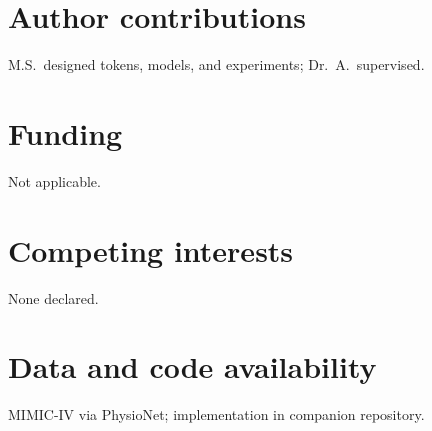 \section*{Author contributions}
M.S.\ designed tokens, models, and experiments; Dr.\ A.\ supervised.

\section*{Funding}
Not applicable.

\section*{Competing interests}
None declared.

\section*{Data and code availability}
MIMIC-IV via PhysioNet; implementation in companion repository.
